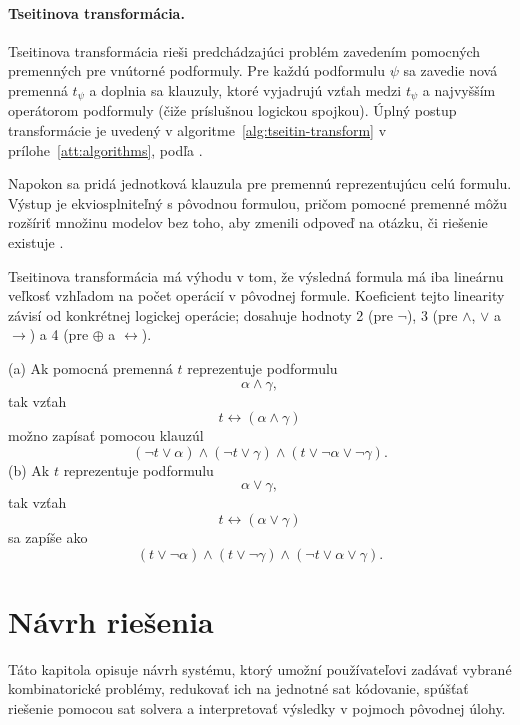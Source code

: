 \paragraph{Tseitinova transformácia.}{}
Tseitinova transformácia rieši predchádzajúci problém zavedením pomocných premenných pre vnútorné podformuly. Pre každú podformulu $\psi$ sa zavedie nová premenná $t_\psi$ a doplnia sa klauzuly, ktoré vyjadrujú vzťah medzi $t_\psi$ a najvyšším operátorom podformuly (čiže príslušnou logickou spojkou). Úplný postup transformácie je uvedený v algoritme~\ref{alg:tseitin-transform} v prílohe~\ref{att:algorithms}, podľa \cite{tseitin70}.

Napokon sa pridá jednotková klauzula pre premennú reprezentujúcu celú formulu. Výstup je ekviosplniteľný s pôvodnou formulou, pričom pomocné premenné môžu rozšíriť množinu modelov bez toho, aby zmenili odpoveď na otázku, či riešenie existuje \cite{tseitin70,clause-norm-convention-for-boolena-circuts}.

Tseitinova transformácia má výhodu v tom, že výsledná formula má iba lineárnu veľkosť vzhľadom na počet operácií v pôvodnej formule. Koeficient tejto linearity závisí od konkrétnej logickej operácie; dosahuje hodnoty 2 (pre $\lnot$), 3 (pre $\land$, $\lor$ a $\rightarrow$) a 4 (pre $\oplus$ a $\leftrightarrow$).

\begin{example}
    (a) Ak pomocná premenná $t$ reprezentuje podformulu
    \[
        \alpha \land \gamma,
    \]
    tak vzťah
    \[
        t \leftrightarrow (\alpha \land \gamma)
    \]
    možno zapísať pomocou klauzúl
    \[
        (\lnot t \lor \alpha)
        \land
        (\lnot t \lor \gamma)
        \land
        (t \lor \lnot \alpha \lor \lnot \gamma).
    \]
    (b) Ak $t$ reprezentuje podformulu
    \[
        \alpha \lor \gamma,
    \]
    tak vzťah
    \[
        t \leftrightarrow (\alpha \lor \gamma)
    \]
    sa zapíše ako
    \[
        (t \lor \lnot \alpha)
        \land
        (t \lor \lnot \gamma)
        \land
        (\lnot t \lor \alpha \lor \gamma).
    \]
\end{example}

\section{Návrh riešenia}\label{sec:design}
Táto kapitola opisuje návrh systému, ktorý umožní používateľovi zadávať vybrané kombinatorické problémy, redukovať ich na jednotné \acrshort{sat} kódovanie, spúšťať riešenie pomocou \acrshort{sat} solvera a interpretovať výsledky v pojmoch pôvodnej úlohy.

